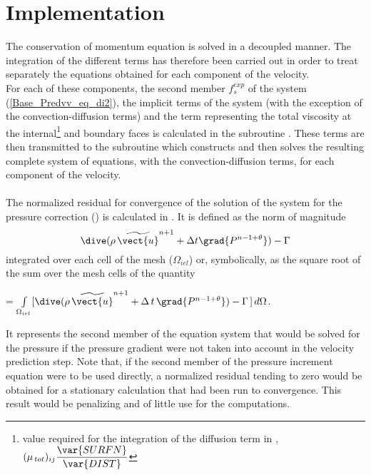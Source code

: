 \section*{Implementation}

The conservation of momentum equation is solved in a decoupled manner. The integration of the different terms has therefore been carried out in order to treat separately the equations obtained for each component of the velocity.\\
For each of these components, the second member $f_s^{exp}$ of the system  (\ref{Base_Predvv_eq_di2}), the implicit terms of the system (with the exception of the convection-diffusion terms) and the term representing the total viscosity at the  internal\footnote{value required for the integration of the diffusion term in , $\displaystyle(\mu_{\,tot})_{ij}\frac{\var{SURFN}}{\var{DIST}}$} and boundary faces is calculated in the subroutine . These terms are then transmitted to the subroutine  which constructs and then solves the resulting complete system of equations, with the convection-diffusion terms, for each component of the velocity.
\\\\
The normalized residual for convergence of the solution of the system for the pressure correction () is calculated in
. It is defined as the norm of magnitude
  $$\dive(\rho\,\widetilde{\vect{u}}^{n+1}+\Delta t \grad{P^{n-1+\theta}})-\Gamma$$
integrated over each cell  of the mesh ($\Omega_{iel}$) or, symbolically, as the square root of the sum over the mesh cells of the quantity
\begin{center}
=
$\int\limits_{\Omega_{iel}}[{\dive(\rho\,\widetilde{\vect{u}}^{n+1}+\Delta\,t\,\grad{P^{n-1+\theta}})
-\Gamma\,]\,d\Omega}$.
\end{center}

It represents the second member of the equation system that would be solved for the pressure if the pressure gradient were not taken into account in the velocity prediction step. Note that, if the second member of the pressure increment equation were to be used directly, a normalized residual tending to zero would be obtained for a stationary calculation that had been run to convergence. This result would be penalizing and of little use for the computations.

